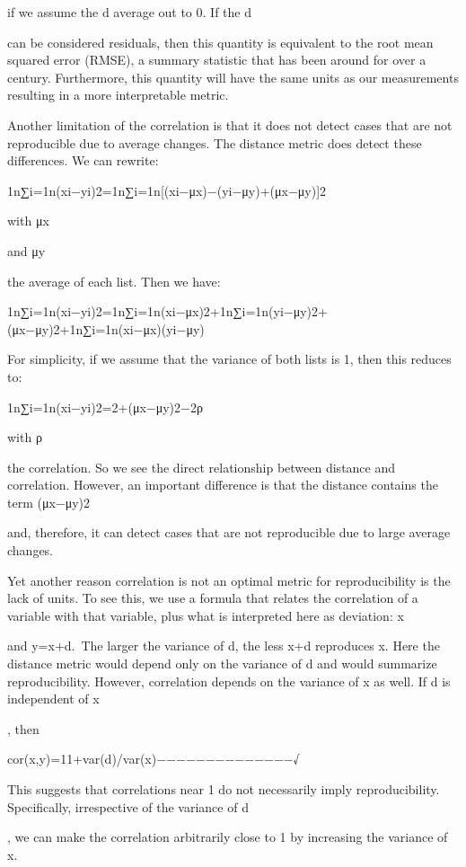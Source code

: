 \documentclass[
]{book}
\begin{document}
if we assume the d average out to 0. If the d

can be considered residuals, then this quantity is equivalent to the root mean squared error (RMSE), a summary statistic that has been around for over a century. Furthermore, this quantity will have the same units as our measurements resulting in a more interpretable metric.

Another limitation of the correlation is that it does not detect cases that are not reproducible due to average changes. The distance metric does detect these differences. We can rewrite:

1n∑i=1n(xi−yi)2=1n∑i=1n{[}(xi−μx)−(yi−μy)+(μx−μy){]}2

with μx

and μy

the average of each list. Then we have:

1n∑i=1n(xi−yi)2=1n∑i=1n(xi−μx)2+1n∑i=1n(yi−μy)2+(μx−μy)2+1n∑i=1n(xi−μx)(yi−μy)

For simplicity, if we assume that the variance of both lists is 1, then this reduces to:

1n∑i=1n(xi−yi)2=2+(μx−μy)2−2ρ

with ρ

the correlation. So we see the direct relationship between distance and correlation. However, an important difference is that the distance contains the term (μx−μy)2

and, therefore, it can detect cases that are not reproducible due to large average changes.

Yet another reason correlation is not an optimal metric for reproducibility is the lack of units. To see this, we use a formula that relates the correlation of a variable with that variable, plus what is interpreted here as deviation: x

and y=x+d.~The larger the variance of d, the less x+d reproduces x. Here the distance metric would depend only on the variance of d and would summarize reproducibility. However, correlation depends on the variance of x as well. If d is independent of x

, then

cor(x,y)=11+var(d)/var(x)−−−−−−−−−−−−−−√

This suggests that correlations near 1 do not necessarily imply reproducibility. Specifically, irrespective of the variance of d

, we can make the correlation arbitrarily close to 1 by increasing the variance of x.
\end{document}
